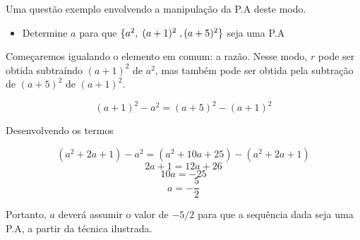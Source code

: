 \documentclass[12pt]{article}
\begin{document}
Uma questão exemplo envolvendo a manipulação da P.A deste modo.

\begin{itemize}
  \item Determine $a$ para que $\{a^{2},\hspace{0.1cm} (a + 1)^{2}\hspace{0.1cm}, (a + 5)^{2}\}$ seja uma P.A
\end{itemize}

Começaremos igualando o elemento em comum: a razão. Nesse modo, $r$ pode ser obtida subtraíndo $(a + 1)^{2}$ de $a^{2}$, mas também pode ser obtida pela subtração de $(a + 5)^{2}$ de $(a + 1)^{2}$.

\[(a + 1)^{2} - a^{2} = (a + 5)^{2} - (a + 1)^{2}\]

Desenvolvendo os termos

\[(a^{2} + 2a + 1) - a^{2} = (a^{2} + 10a + 25) - (a^{2} + 2a + 1)\]
\[2a + 1 = 12a + 26\]
\[10a = -25\]
\[a = -\frac{5}{2}\]

Portanto, $a$ deverá assumir o valor de $-5/2$ para que a sequência dada seja uma P.A, a partir da técnica ilustrada.
\end{document}
